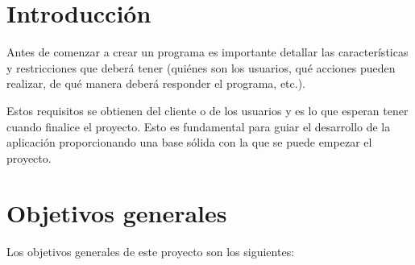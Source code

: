\newcommand{\cu}[9]{
    \begin{table}[p]
        \centering
        \begin{tabularx}{\linewidth}{ p{0.21\columnwidth} p{0.71\columnwidth} }
            \toprule
            \textbf{CU-#1}      & \textbf{#2} \\
            \toprule
            \textbf{Versión}              & 1.0          \\
            \textbf{Autor}                & \theauthor  \\
            \textbf{Requisitos asociados} & #3          \\
            \textbf{Descripción}          & #4          \\
            \textbf{Precondición}         & #5          \\
            \textbf{Acciones}             & #6          \\
            \textbf{Postcondición}        & #7          \\
            \textbf{Excepciones}          & #8          \\
            \textbf{Importancia}          & #9          \\
            \bottomrule
        \end{tabularx}
        \caption{CU-#1 #2.}
    \end{table}
}


\section{Introducción}

Antes de comenzar a crear un programa es importante detallar las características y restricciones que deberá tener (quiénes son los usuarios, qué acciones pueden realizar, de qué manera deberá responder el programa, etc.).

Estos requisitos se obtienen del cliente o de los usuarios y es lo que esperan tener cuando finalice el proyecto. Esto es fundamental para guiar el desarrollo de la aplicación proporcionando una base sólida con la que se puede empezar el proyecto.

\section{Objetivos generales}

Los objetivos generales de este proyecto son los siguientes:

